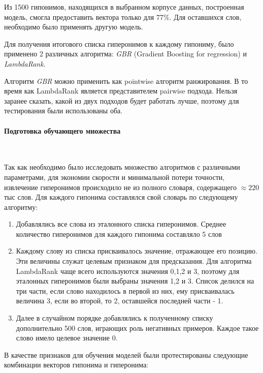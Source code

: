Из 1500 гипонимов, находящихся в выбранном корпусе данных, построенная модель,
смогла предоставить вектора только для 77\%. Для оставшихся слов, необходимо было
применять другую модель.

Для получения итогового списка гиперонимов к каждому гипониму, было применено 2
различных алгоритма: \textit{GBR} (Gradient Boosting for regression) и \textit{LambdaRank}.

Алгоритм \textit{GBR} можно применить как pointwise алгоритм ранжирования. В то время как
LambdaRank является представителем pairwise подхода. Нельзя заранее сказать, какой из
двух подходов будет работать лучше, поэтому для тестирования были использованы оба.

\paragraph{Подготовка обучающего множества}
~\
~\

Так как необходимо было исследовать множество алгоритмов с различными параметрами,
для экономии скорости и минимальной потери точности, извлечение гиперонимов
происходило не из полного словаря, содержащего $\approx 220$ тыс слов. Для каждого гипонима
составлялся свой словарь по следующему алгоритму:

\begin{enumerate}
\item Добавлялись все слова из эталонного списка гиперонимов. Среднее количество
гиперонимов для каждого гипонима составляло 5 слов

\item Каждому слову из списка присваивалось значение, отражающее его позицию. Эти
величины служат целевым признаком для предсказания. Для алгоритма
LambdaRank чаще всего используются значения 0,1,2 и 3, поэтому для эталонных
гиперонимов были выбраны значения 1,2 и 3. Список делился на три части, если
слово находилось в первой из них, ему присваивалась величина 3, если во
второй, то 2, оставшейся последней части - 1.

\item Далее в случайном порядке добавлялись к полученному списку дополнительно 500
слов, играющих роль негативных примеров. Каждое такое слово имело целевое
значение 0.
\end{enumerate}

В качестве признаков для обучения моделей были протестированы следующие
комбинации векторов гипонима и гиперонима:

